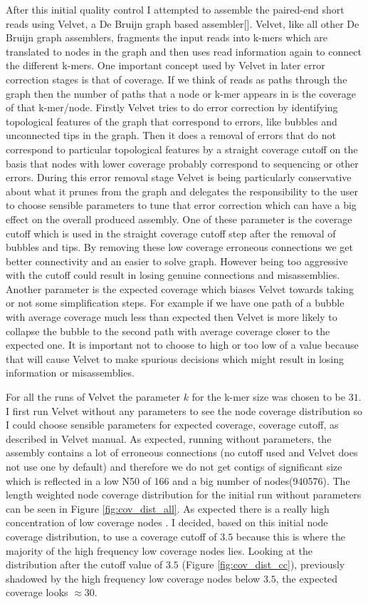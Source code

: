 \documentclass[a4paper,12pt]{article}
\begin{document}
After this initial quality control I attempted to assemble the
paired-end short reads using Velvet, a De Bruijn graph based
assembler[\cite{zerbino2008velvet}]. Velvet, like all other De Bruijn
graph assemblers, fragments the input reads into k-mers which are
translated to nodes in the graph and then uses read information again
to connect the different k-mers.  One important concept used by Velvet in
later error correction stages is that of coverage. If we think of
reads as paths through the graph then the number of paths that a node
or k-mer appears in is the coverage of that k-mer/node. Firstly Velvet
tries to do error correction by identifying topological features of
the graph that correspond to errors, like bubbles and unconnected tips
in the graph. Then it does a removal of errors that do not correspond
to particular topological features by a straight coverage cutoff on
the basis that nodes with lower coverage probably correspond to
sequencing or other errors. During this error removal stage Velvet is
being particularly conservative about what it prunes from the graph
and delegates the responsibility to the user to choose sensible
parameters to tune that error correction which can have a big effect
on the overall produced assembly.  One of these parameter is the
coverage cutoff which is used in the straight coverage cutoff step
after the removal of bubbles and tips. By removing these low coverage
erroneous connections we get better connectivity and an easier to solve graph. However being too aggressive with the cutoff could result in losing genuine connections and misassemblies. Another parameter is the
expected coverage which biases Velvet towards taking or not some
simplification steps. For example if we have one path of a bubble with
average coverage much less than expected then Velvet is more likely to
collapse the bubble to the second path with average coverage closer to
the expected one. It is important not to choose to high or too low of
a value because that will cause Velvet to make spurious decisions
which might result in losing information or misassemblies.

For all the runs of Velvet the parameter $k$ for the k-mer size was
chosen to be $31$. I first run Velvet without any parameters to see
the node coverage distribution so I could choose sensible parameters
for expected coverage, coverage cutoff, as described in Velvet
manual. As expected, running without parameters, the assembly contains
a lot of erroneous connections (no cutoff used and Velvet does not use
one by default) and therefore we do not get contigs of significant
size which is reflected in a low N50 of 166 and a big number of nodes(940576).
The length weighted node coverage distribution for the initial run
without parameters can be seen in Figure \ref{fig:cov_dist_all}. As
expected there is a really high concentration of low coverage nodes
. I decided, based
on this initial node coverage distribution, to use a coverage cutoff
of $3.5$ because this is where the majority of the high frequency low
coverage nodes lies.  Looking at the distribution after the cutoff
value of $3.5$ (Figure \ref{fig:cov_dist_cc}), previously shadowed by
the high frequency low coverage nodes below $3.5$, the expected
coverage looks $\approx 30$.
\end{document}
